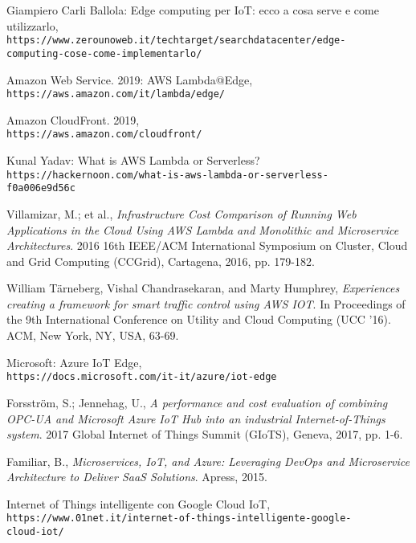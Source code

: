 \documentclass[a4paper,12pt,oneside]{book}
\begin{document}
\begin{thebibliography}{9}
	Giampiero Carli Ballola: Edge computing per IoT: ecco a cosa serve e come utilizzarlo,
	\\\texttt{https://www.zerounoweb.it/techtarget/searchdatacenter/edge-\\computing-cose-come-implementarlo/}
		
	Amazon Web Service. 2019: AWS Lambda@Edge,
	\\\texttt{https://aws.amazon.com/it/lambda/edge/}
	
	Amazon CloudFront. 2019,
	\\\texttt{https://aws.amazon.com/cloudfront/}
	
	Kunal Yadav: What is AWS Lambda or Serverless?
	\\\texttt{https://hackernoon.com/what-is-aws-lambda-or-serverless-\\f0a006e9d56c}

	
	Villamizar, M.; et al., 
	\textit{Infrastructure Cost Comparison of Running Web Applications in the Cloud Using AWS Lambda and Monolithic and Microservice Architectures}. 
	2016 16th IEEE/ACM International Symposium on Cluster, Cloud and Grid Computing (CCGrid), Cartagena, 2016, pp. 179-182.
	
	William Tärneberg, Vishal Chandrasekaran, and Marty Humphrey, 
	\textit{Experiences creating a framework for smart traffic control using AWS IOT}. 
	In Proceedings of the 9th International Conference on Utility and Cloud Computing (UCC '16). ACM, New York, NY, USA, 63-69.
	
	Microsoft: Azure IoT Edge,
	\\\texttt{https://docs.microsoft.com/it-it/azure/iot-edge}
	
	Forsström, S.; Jennehag, U., 
	\textit{A performance and cost evaluation of combining OPC-UA and Microsoft Azure IoT Hub into an industrial Internet-of-Things system}. 
	2017 Global Internet of Things Summit (GIoTS), Geneva, 2017, pp. 1-6.
	
	Familiar, B., 
	\textit{Microservices, IoT, and Azure: Leveraging DevOps and Microservice Architecture to Deliver SaaS Solutions}. 
	Apress, 2015.
	
	Internet of Things intelligente con Google Cloud IoT,
	\\\texttt{https://www.01net.it/internet-of-things-intelligente-google-\\cloud-iot/}
	

\end{thebibliography}
\end{document}
